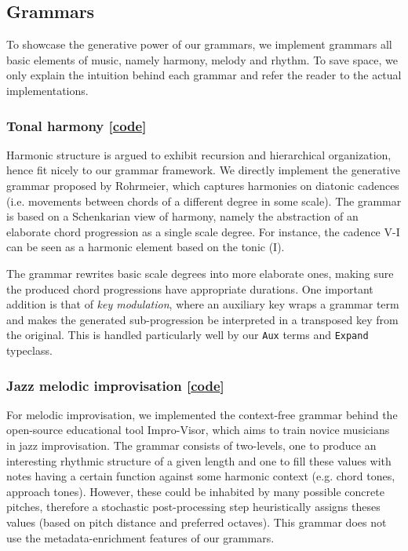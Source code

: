 \documentclass[11pt,a4paper]{article}
\newcommand{\icode}[1]{\texttt{#1}}
\begin{document}
\subsection{Grammars}
To showcase the generative power of our grammars, we implement grammars all basic elements of music, namely harmony, melody and rhythm. To save space, we only explain the intuition behind each grammar and refer the reader to the actual implementations.

\subsubsection{Tonal harmony [\href{https://github.com/omelkonian/AlgoRhythm/blob/master/AlgoRhythm/src/Grammar/TonalHarmony.hs}{code}]}
Harmonic structure is argued to exhibit recursion and hierarchical organization, hence fit nicely to our grammar framework. We directly implement the generative grammar proposed by Rohrmeier\cite{tonal}, which captures harmonies on diatonic cadences (i.e. movements between chords of a different degree in some scale). The grammar is based on a Schenkarian view of harmony\cite{schenker}, namely the abstraction of an elaborate chord progression as a single scale degree. For instance, the cadence V-I can be seen as a harmonic element based on the tonic (I).

The grammar rewrites basic scale degrees into more elaborate ones, making sure the produced chord progressions have appropriate durations. One important addition is that of \textit{key modulation}, where an auxiliary key wraps a grammar term and makes the generated sub-progression be interpreted in a transposed key from the original. This is handled particularly well by our \icode{Aux} terms and \icode{Expand} typeclass.

\subsubsection{Jazz melodic improvisation [\href{https://github.com/omelkonian/AlgoRhythm/blob/master/AlgoRhythm/src/Grammar/Melody.hs}{code}]}
For melodic improvisation, we implemented the context-free grammar behind the open-source educational tool Impro-Visor\cite{improvisor}, which aims to train novice musicians in jazz improvisation. The grammar consists of two-levels, one to produce an interesting rhythmic structure of a given length and one to fill these values with notes having a certain function against some harmonic context (e.g. chord tones, approach tones). However, these could be inhabited by many possible concrete pitches, therefore a stochastic post-processing step heuristically assigns theses values (based on pitch distance and preferred octaves). This grammar does not use the metadata-enrichment features of our grammars.
\end{document}
